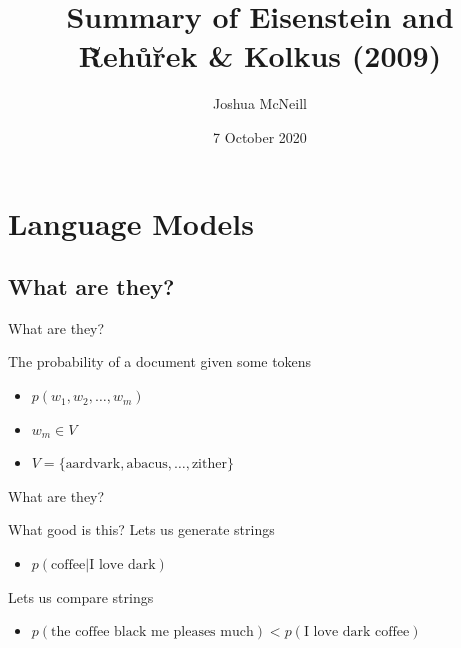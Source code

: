 \documentclass{beamer}
\author{Joshua McNeill}
\title{Summary of Eisenstein and R̆ehůr̆ek \& Kolkus (2009)}
\date{7 October 2020}
\begin{document}
  \begin{frame}
    \titlepage
  \end{frame}

  \begin{frame}
    \tableofcontents[hideallsubsections]
  \end{frame}


  \section{Language Models}
    \newcommand{\subone}{What are they?}
    \subsection{\subone}
      \begin{frame}{\subone}
        \begin{block}{The probability of a document given some tokens}
          \begin{itemize}
            \item $p(w_1, w_2, \ldots, w_m)$
            \item $w_m \in V$
            \item $V = \{ \text{aardvark}, \text{abacus}, \ldots, \text{zither} \}$
          \end{itemize}
        \end{block}
      \end{frame}

      \begin{frame}{\subone}
        \begin{block}{What good is this?}
          Lets us generate strings
          {\small
            \begin{itemize}
              \item $p ( \text{coffee} | \text{I love dark} )$
            \end{itemize}
          }
          Lets us compare strings
          {\small
            \begin{itemize}
              \item $p ( \text{the coffee black me pleases much} ) < p ( \text{I love dark coffee} )$
            \end{itemize}
          }
        \end{block}
      \end{frame}
\end{document}
